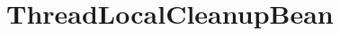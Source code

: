 \section{ThreadLocalCleanupBean}
\label{feature:ThreadLocalCleanupBean}
\AvailableInJavaAndCsharp{\TODO}